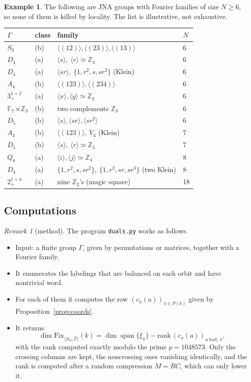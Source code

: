 \documentclass[11pt]{amsart}
\theoremstyle{definition}
\newtheorem{example}[theorem]{Example}
\theoremstyle{remark}
\newtheorem{remark}[theorem]{Remark}
\theoremstyle{plain}
\numberwithin{equation}{section}
\numberwithin{table}{section}
\newcommand{\Z}{\mathbb Z}
\newcommand{\F}{\mathbb F}
\newcommand{\Fix}{\mathrm{Fix}}
\DeclareMathOperator{\spn}{span}
\begin{document}
\begin{example}\label{ex:table}
The following are JNA groups with Fourier families of size $N\ge6$, so none of them is killed by locality. The list is illustrative, not exhaustive.
\begin{center}
\begin{tabular}{@{}llll@{}}\toprule
$\Gamma$ & class & family & $N$\\\midrule
$S_3$ & (b) & $\langle(12)\rangle,\langle(23)\rangle,\langle(13)\rangle$ & 6\\
$D_4$ & (a) & $\langle s\rangle,\ \langle r\rangle\simeq\Z_4$ & 6\\
$D_4$ & (a) & $\langle sr\rangle,\ \{1,r^2,s,sr^2\}$ (Klein) & 6\\
$A_4$ & (b) & $\langle(123)\rangle,\langle(234)\rangle$ & 6\\
$3^{1+2}_+$ & (a) & $\langle x\rangle,\langle y\rangle\simeq\Z_3$ & 6\\
$\F_7\rtimes\Z_3$ & (b) & two complements $\Z_3$ & 6\\
$D_5$ & (b) & $\langle s\rangle,\langle sr\rangle,\langle sr^2\rangle$ & 6\\
$A_4$ & (b) & $\langle(123)\rangle,\ V_4$ (Klein) & 7\\
$D_5$ & (b) & $\langle s\rangle,\ \langle r\rangle\simeq\Z_5$ & 7\\
$Q_8$ & (a) & $\langle i\rangle,\langle j\rangle\simeq\Z_4$ & 8\\
$D_4$ & (a) & $\{1,r^2,s,sr^2\},\ \{1,r^2,sr,sr^3\}$ (two Klein) & 8\\
$2^{1+4}_+$ & (a) & nine $\Z_2$'s (magic square) & 18\\\bottomrule
\end{tabular}
\end{center}
\end{example}

\subsection{Computations}

\begin{remark}[method]
The program \texttt{duals.py} works as follows.
\begin{itemize}
\item Input: a finite group $\Gamma$, given by permutations or matrices, together with a Fourier family.
\item It enumerates the labelings that are balanced on each orbit and have nontrivial word.
\item For each of them it computes the row $(c_\pi(a))_{\pi\in P(k)}$ given by Proposition~\ref{prop:coords}.
\item It returns
\[
\dim\Fix_{\langle S_N,\widehat\Gamma\rangle}(k)=\dim\spn\{\xi_\pi\}-\mathrm{rank}\,(c_\pi(a))_{a\ \mathrm{bad},\,\pi},
\]
with the rank computed exactly modulo the prime $p=1048573$. Only the crossing columns are kept, the noncrossing ones vanishing identically, and the rank is computed after a random compression $M=RC$, which can only lower it.
\end{itemize}
\end{remark}
\end{document}

